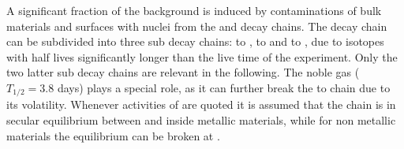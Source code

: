 A significant fraction of the background is induced by contaminations of bulk materials and surfaces with nuclei from the  and  decay chains. The  decay chain can be subdivided into three sub decay chains:  to ,  to  and  to , due to isotopes with half lives significantly longer than the live time of the experiment. Only the two latter sub decay chains are relevant in the following. The noble gas  ($T_{1/2} = 3.8$ days) plays a special role, as it can further break the  to  chain due to its volatility. Whenever activities of  are quoted it is assumed that the chain is in secular equilibrium between  and  inside metallic materials, while for non metallic materials the equilibrium can be broken at .
